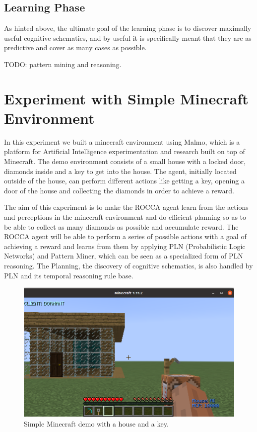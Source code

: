 \documentclass[runningheads]{llncs}
\begin{document}
\subsection{Learning Phase}
As hinted above, the ultimate goal of the learning phase is to
discover maximally useful cognitive schematics, and by useful it is
specifically meant that they are as predictive and cover as many cases
as possible.

TODO: pattern mining and reasoning.

\section{Experiment with Simple Minecraft Environment}

In this experiment we built a minecraft environment using Malmo, which is a platform for Artificial Intelligence experimentation and research built on top of Minecraft. The demo environment consists of a small house with a locked door, diamonds inside and a key to get into the house. The agent, initially located outside of the house, can perform different actions like getting a key, opening a door of the house and collecting the diamonds in order to achieve a reward. \par
The aim of this experiment is to make the ROCCA agent learn from the actions and perceptions in the minecraft environment and do efficient planning so as to be able to collect as many diamonds as possible and accumulate reward. The ROCCA agent will be able to perform a series of possible actions with a goal of achieving a reward and learns from them by applying PLN (Probabilistic Logic Networks) and Pattern Miner, which can be seen as a specialized form of PLN reasoning. The Planning, the discovery of cognitive schematics, is also handled by PLN and its temporal reasoning rule base.

\begin{figure}[htbp]
\centerline{\includegraphics[scale=.2]{pictures/simple_demo.png}}
\caption{Simple Minecraft demo with a house and a key.}
\label{fig}
\end{figure}
\end{document}
